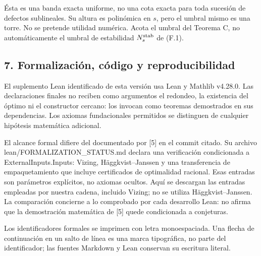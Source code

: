 \documentclass[spanish,11pt,a4paper]{article}
\begin{document}
Ésta es una banda exacta uniforme, no una cota exacta para toda sucesión de defectos sublineales. Su altura es polinómica en \(s\), pero el umbral mismo es una torre. No se pretende utilidad numérica. Acota el umbral del Teorema C, no automáticamente el umbral de estabilidad \(N_s^{\rm stab}\) de (F.1).

\subsection{7. Formalización, código y reproducibilidad}\label{formalizacion-codigo-y-reproducibilidad}

El suplemento Lean identificado de esta versión usa Lean y Mathlib v4.28.0. Las declaraciones finales no reciben como argumentos el redondeo, la existencia del óptimo ni el constructor cercano: los invocan como teoremas demostrados en sus dependencias. Los axiomas fundacionales permitidos se distinguen de cualquier hipótesis matemática adicional.

El alcance formal difiere del documentado por {[}5{]} en el commit citado. Su archivo {\ttfamily\small lean/\discretionary{\hbox{\ensuremath{\hookrightarrow}}}{}{}FORMALIZATIO\discretionary{\hbox{\ensuremath{\hookrightarrow}}}{}{}N\_\discretionary{\hbox{\ensuremath{\hookrightarrow}}}{}{}STATUS.\discretionary{\hbox{\ensuremath{\hookrightarrow}}}{}{}md} declara una verificación condicionada a {\ttfamily\small ExternalInpu\discretionary{\hbox{\ensuremath{\hookrightarrow}}}{}{}ts.\discretionary{\hbox{\ensuremath{\hookrightarrow}}}{}{}Inputs}: Vizing, Häggkvist--Janssen y una transferencia de empaquetamiento que incluye certificados de optimalidad racional. Esas entradas son parámetros explícitos, no axiomas ocultos. Aquí se descargan las entradas empleadas por nuestra cadena, incluido Vizing; no se utiliza Häggkvist--Janssen. La comparación concierne a lo comprobado por cada desarrollo Lean: no afirma que la demostración matemática de {[}5{]} quede condicionada a conjeturas.

Los identificadores formales se imprimen con letra monoespaciada. Una flecha de continuación en un salto de línea es una marca tipográfica, no parte del identificador; las fuentes Markdown y Lean conservan su escritura literal.
\end{document}
